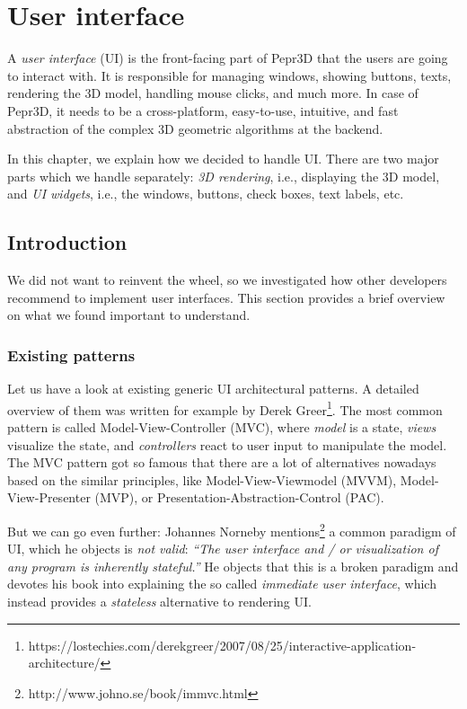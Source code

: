 \chapter{User interface}

A \emph{user interface} (UI) is the front-facing part of Pepr3D that the users are going to interact with.
It is responsible for managing windows, showing buttons, texts, rendering the 3D model, handling mouse clicks, and much more.
In case of Pepr3D, it needs to be a cross-platform, easy-to-use, intuitive, and fast abstraction of the complex 3D geometric algorithms at the backend.

\medskip

In this chapter, we explain how we decided to handle UI.
There are two major parts which we handle separately: \emph{3D rendering}, i.e., displaying the 3D model, and \emph{UI widgets}, i.e., the windows, buttons, check boxes, text labels, etc.

\section{Introduction}

We did not want to reinvent the wheel, so we investigated how other developers recommend to implement user interfaces.
This section provides a brief overview on what we found important to understand.

\subsection{Existing patterns}

Let us have a look at existing generic UI architectural patterns.
A detailed overview of them was written for example by Derek Greer\footnote{https://lostechies.com/derekgreer/2007/08/25/interactive-application-architecture/}.
The most common pattern is called Model-View-Controller (MVC), where \emph{model} is a state, \emph{views} visualize the state, and \emph{controllers} react to user input to manipulate the model.
The MVC pattern got so famous that there are a lot of alternatives nowadays based on the similar principles, like Model-View-Viewmodel (MVVM), Model-View-Presenter (MVP), or Presentation-Abstraction-Control (PAC).

But we can go even further: Johannes Norneby mentions\footnote{http://www.johno.se/book/immvc.html} a common paradigm of UI, which he objects is \emph{not valid}: \emph{``The user interface and / or visualization of any program is inherently stateful.''}
He objects that this is a broken paradigm and devotes his book into explaining the so called \emph{immediate user interface}, which instead provides a \emph{stateless} alternative to rendering UI.

